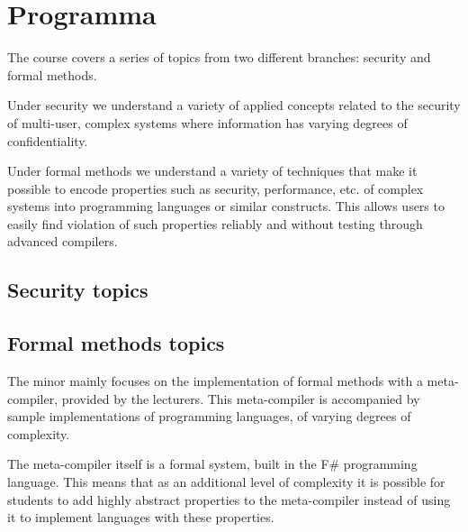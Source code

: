 \section{Programma}
	The course covers a series of topics from two different branches: security and formal methods. 

	Under security we understand a variety of applied concepts related to the security of multi-user, complex systems where information has varying degrees of confidentiality.
	
	Under formal methods we understand a variety of techniques that make it possible to encode properties such as security, performance, etc. of complex systems into programming languages or similar constructs. This allows users to easily find violation of such properties reliably and without testing through advanced compilers.
	
	\subsection*{Security topics}

	\subsection*{Formal methods topics}
		The minor mainly focuses on the implementation of formal methods with a meta-compiler, provided by the lecturers. This meta-compiler is accompanied by sample implementations of programming languages, of varying degrees of complexity.
		
		The meta-compiler itself is a formal system, built in the F\# programming language. This means that as an additional level of complexity it is possible for students to add highly abstract properties to the meta-compiler instead of using it to implement languages with these properties.
